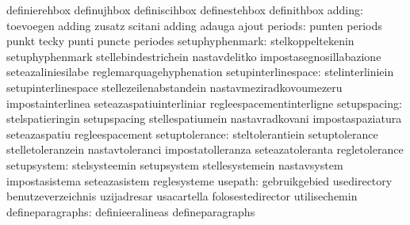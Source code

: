                                   definierehbox                    definujhbox
                                  definiscihbox                    definestehbox
                                  definithbox
                          adding: toevoegen                        adding
                                  zusatz                           scitani
                                  adding                           adauga
                                  ajout
                         periods: punten                           periods
                                  punkt                            tecky
                                  punti                            puncte
                                  periodes
                 setuphyphenmark: stelkoppeltekenin                setuphyphenmark
                                  stellebindestrichein             nastavdelitko
                                  impostasegnosillabazione         seteazaliniesilabe
                                  reglemarquagehyphenation
             setupinterlinespace: stelinterliniein                 setupinterlinespace
                                  stellezeilenabstandein           nastavmeziradkovoumezeru
                                  impostainterlinea                seteazaspatiuinterliniar
                                  regleespacementinterligne
                    setupspacing: stelspatieringin                 setupspacing
                                  stellespatiumein                 nastavradkovani
                                  impostaspaziatura                seteazaspatiu
                                  regleespacement
                  setuptolerance: steltolerantiein                 setuptolerance
                                  stelletoleranzein                nastavtoleranci
                                  impostatolleranza                seteazatoleranta
                                  regletolerance
                     setupsystem: stelsysteemin                    setupsystem
                                  stellesystemein                  nastavsystem
                                  impostasistema                   seteazasistem
                                  reglesysteme
                         usepath: gebruikgebied                    usedirectory
                                  benutzeverzeichnis               uzijadresar %
                                  usacartella                      folosestedirector
                                  utilisechemin
                defineparagraphs: definieeralineas                 defineparagraphs
